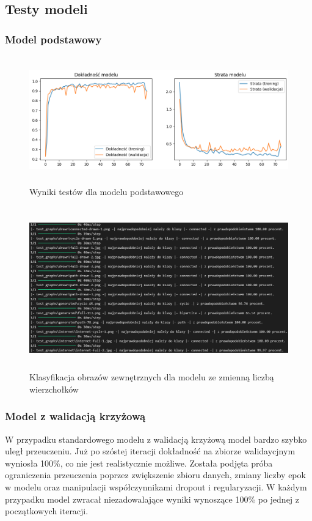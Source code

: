 \subsection{Testy modeli}
\subsubsection{Model podstawowy}

\begin{figure}[ht]
	\centering
	\includegraphics[height=5.5cm]{partials/images/tests/v2_epoch75.png}
	\caption{Wyniki testów dla modelu podstawowego}
	\label{Fig:tests-base-1}
\end{figure}
\FloatBarrier

\begin{figure}[ht]
	\centering
	\includegraphics[height=7cm]{partials/images/tests/v2_epoch75_img_tests.png}
	\caption{Klasyfikacja obrazów zewnętrznych dla modelu ze zmienną liczbą wierzchołków}
	\label{Fig:tests-base-2}
\end{figure}
\FloatBarrier

\subsubsection{Model z walidacją krzyżową}

W przypadku standardowego modelu z walidacją krzyżową model bardzo szybko uległ przeuczeniu.
Już po szóstej iteracji dokładność na zbiorze walidaycjnym wyniosła 100\%, co nie jest realistycznie możliwe.
Została podjęta próba ograniczenia przeuczenia poprzez zwiększenie zbioru danych, zmiany liczby epok w modelu
oraz manipulacji współczynnikami dropout i regularyzacji.
W każdym przypadku model zwracał niezadowalające wyniki wynoszące 100\% po jednej z początkowych iteracji.

